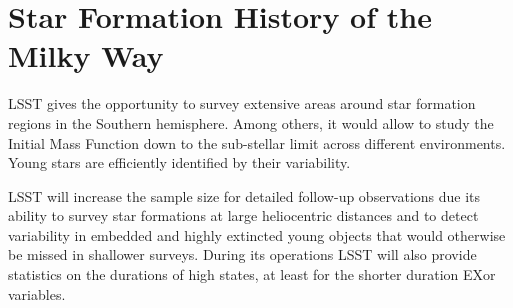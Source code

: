 %
%
%
%
%
%
%

\section{Star Formation History of the Milky Way}
\def\secname{MW_SFH}\label{sec:\secname} %



LSST gives the opportunity to survey extensive areas
around star formation regions in the Southern hemisphere. Among
others, it would allow to study the Initial Mass Function down to the
sub-stellar limit across different environments. Young stars are
efficiently identified by their variability.

LSST will increase the sample size for detailed follow-up observations due its ability to survey
star formations at large heliocentric distances and to detect variability in embedded and highly
extincted young objects that would otherwise be missed in shallower surveys. During its operations
LSST will also provide statistics on the durations of high states, at least for the shorter duration
EXor variables.

